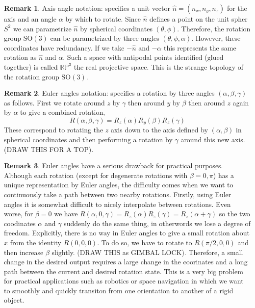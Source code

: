 \documentclass[12pt]{extarticle}
\newcommand{\rp}{\mathbb{RP}}
\theoremstyle{definition}
\newtheorem{remark}{Remark}
\newcommand{\SO}[1]{\mathrm{SO}\left(#1\right)}
\newcommand{\rd}[1]{{ \color{red} #1 }}
\begin{document}
\begin{remark}
Axis angle notation: specifies a unit vector $\hat{n} = (n_x, n_y, n_z)$ for the axis and an angle $\alpha$ by which to rotate. Since $\hat{n}$ defines a point on the unit spher $S^2$ we can parametrize $\hat{n}$ by spherical coordinates $(\theta, \phi)$. Therefore, the rotation group $\SO{3}$ can be parametrized by three angles $(\theta, \phi, \alpha)$. However, these coordinates have redundancy. If we take $-\hat{n}$ and $-\alpha$ this represents the same rotation as $\hat{n}$ and $\alpha$. Such a space with antipodal points identified (glued together) is called $\rp^3$ the real projective space. This is the strange topology of the rotation group $\SO{3}$. 
\end{remark}

\begin{remark}
Euler angles notation: specifies a rotation by three angles $(\alpha, \beta, \gamma)$ as follows. First we rotate around $z$ by $\gamma$ then around $y$ by $\beta$ then around $z$ again by $\alpha$ to give a combined rotation,
\[ R(\alpha, \beta, \gamma) = R_{z}(\alpha) R_{y}(\beta) R_{z}(\gamma) \]
These correspond to rotating the $z$ axis down to the axis defined by $(\alpha, \beta)$ in spherical coordinates and then performing a rotation by $\gamma$ around this new axis. \rd{ (DRAW THIS FOR A TOP). } 
\end{remark}

\begin{remark}
Euler angles have a serious drawback for practical purposes. Although each rotation (except for degenerate rotations with $\beta = 0, \pi$) has a unique representation by Euler angles, the difficulty comes when we want to continuously take a path between two nearby rotations. Firstly, using Euler angles it is somewhat difficult to nicely interpolate between rotations. Even worse, for $\beta = 0$ we have $R(\alpha, 0, \gamma) = R_z(\alpha) R_z(\gamma) = R_z(\alpha + \gamma)$ so the two coodinates $\alpha$ and $\gamma$ suddenly do the same thing, in otherwords we lose a degree of freedom. Explicitly, there is no way in Euler angles to give a small rotation about $x$ from the identity $R(0,0,0)$. To do so, we have to rotate to $R(\pi/2, 0, 0)$ and then increase $\beta$ slightly. \rd{(DRAW THIS as GIMBAL LOCK).} Therefore, a small change in the desired output requires a large change in the coorinates and a long path between the current and desired rotation state. This is a very big problem for practical applications such as robotics or space navigation in which we want to smoothly and quickly transiton from one orientation to another of a rigid object. 
\end{remark}
\end{document}
